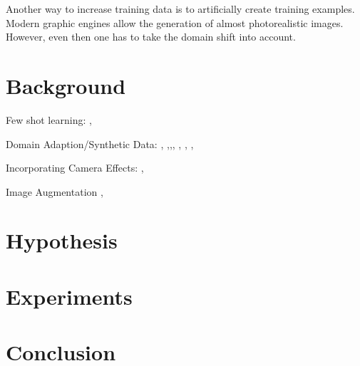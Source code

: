 Another way to increase training data is to artificially create training examples. Modern graphic engines allow the generation of almost photorealistic images. However, even then one has to take the domain shift into account.



\section{Background}
Few shot learning:
   \cite{Moysset2016}, \cite{Chen2018a}

Domain Adaption/Synthetic Data:
 \cite{Chen2018c}, \cite{Xu2017}
\cite{Tremblay2018a} ,\cite{Inoue},\cite{Peng},
\cite{Rozantsev},  \cite{Le}, \cite{Liu2017}, \cite{Peng2017}

Incorporating Camera Effects:
\cite{Carlson2018},\cite{Vass}

Image Augmentation
 \cite{Bai2017},
 
\section{Hypothesis}


 
\section{Experiments}

\section{Conclusion}




%	
%	

